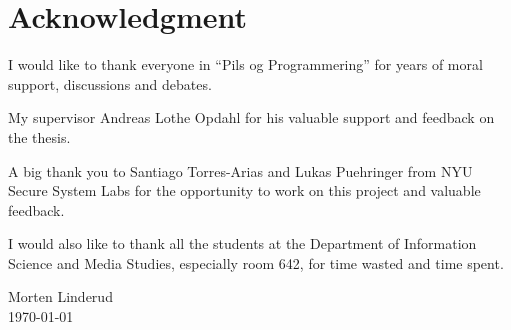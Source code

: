 \documentclass[../Main/thesis.tex]{subfiles}
\begin{document}
\chapter*{Acknowledgment}
I would like to thank everyone in ``Pils og Programmering'' for years of moral
support, discussions and debates.

My supervisor Andreas Lothe Opdahl for his valuable support and feedback on the
thesis.

A big thank you to Santiago Torres-Arias and Lukas Puehringer from NYU Secure
System Labs for the opportunity to work on this project and valuable feedback.

I would also like to thank all the students at the Department of Information
Science and Media Studies, especially room 642, for time wasted and time spent.


\begin{flushright}
Morten Linderud\\
\today
\end{flushright}

\blankpage
\end{document}
